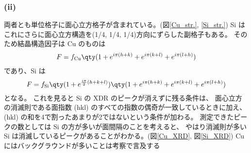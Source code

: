 \documentclass[11pt,dvipdfmx,a4paper]{jsarticle}
\begin{document}
\subsubsection*{(ii)}
両者とも単位格子に面心立方格子が含まれている。(図\ref{Cu_str.}, \ref{Si_str.})
Si はこれにさらに面心立方構造を(1/4, 1/4, 1/4)方向にずらした副格子もある。%
そのため結晶構造因子は Cu のものは
\begin{align}
	F = f_{\text{Cu}}\qty(1+e^{i\pi(h+k)}+e^{i\pi(k+l)}+e^{i\pi(l+h)})
\end{align}
であり、Si は
\begin{align}
	F = f_{\text{Si}}\qty(1+e^{\frac{i\pi}{2}(h+k+l)})\qty(1+e^{i\pi(h+k)}+e^{i\pi(k+l)}+e^{i\pi(l+h)})
\end{align}
となる。
これを見ると Si の XDR のピークが消えずに残る条件は、
面心立方の消滅則である面指数 (hkl) のすべての指数の偶奇が一致しているときに加え、
(hkl) の和を4で割ったあまりが2ではないという条件が加わる。
測定できたピークの数としては Si の方が多いが面間隔のことを考えると、
やはり消滅則が多い Si は消滅しているピークがあることがわかる。(図\ref{Cu_XRD}, 図\ref{Si_XRD})%
Cu にはバックグラウンドが多いことは考察で言及する\\ %
\end{document}
